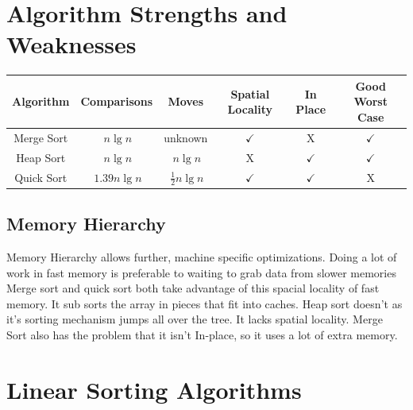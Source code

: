 \documentclass[english, 10pt]{article}
\begin{document}
\section{Algorithm Strengths and Weaknesses}

\begin{center}
\begin{tabular}{cccccc}
    Algorithm  & Comparisons      & Moves                 & Spatial Locality & In Place     & Good Worst Case \\ \toprule
    Merge Sort & $~n\lg n$        & unknown               & $\checkmark$     & X            & $\checkmark$ \\ \midrule
    Heap Sort  & $~n\lg n$        & $~n \lg n$            & X                & $\checkmark$ & $\checkmark$ \\ \midrule
    Quick Sort & $~1.39 n \lg n $ & $~\frac{1}{2}n\lg n $ & $\checkmark$     & $\checkmark$ & X \\
\end{tabular}
\end{center}

\subsection{Memory Hierarchy}
Memory Hierarchy allows further, machine specific optimizations. Doing a lot of
work in fast memory is preferable to waiting to grab data from slower memories
Merge sort and quick sort both take advantage of this spacial locality of fast
memory. It sub sorts the array in pieces that fit into caches. Heap sort
doesn't as it's sorting mechanism jumps all over the tree. It lacks spatial
locality. Merge Sort also has the problem that it isn't In-place, so it uses a
lot of extra memory.


\section{Linear Sorting Algorithms}
\end{document}
